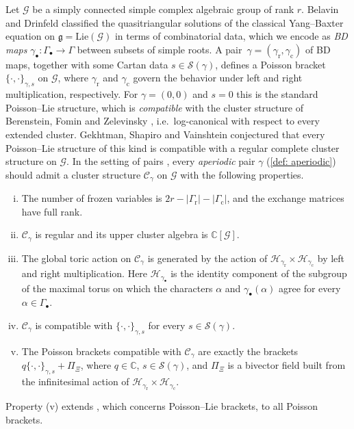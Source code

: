 \documentclass[a4paper]{amsart}
\numberwithin{equation}{section}
\theoremstyle{definition}
\theoremstyle{remark}
\newcommand{\bbC}{\mathbb{C}}
\newcommand{\mfg}{\mathfrak{g}}
\newcommand{\mcG}{\mathcal{G}}
\newcommand{\mcH}{\mathcal{H}}
\newcommand{\mcC}{\mathcal{C}}
\newcommand{\mcS}{\mathcal{S}}
\newcommand{\rr}{\mathrm{r}}
\newcommand{\cc}{\mathrm{c}}
\newcommand{\toric}{\Pi}
\begin{document}
Let $\mcG$ be a simply connected simple complex algebraic group of rank $r$.
Belavin and Drinfeld \cite{BD82} classified the quasitriangular solutions of the classical Yang--Baxter equation on $\mfg=\mathrm{Lie}(\mcG)$ in terms of combinatorial data, which we encode as \emph{BD maps} $\gamma_\bullet:\Gamma_\bullet\to\Gamma$ between subsets of simple roots.
A pair~$\gamma=(\gamma_{\rr},\gamma_{\cc})$ of BD maps, together with some Cartan data $s\in\mcS(\gamma)$, defines a Poisson bracket~$\{\cdot,\cdot\}_{\gamma,s}$ on $\mcG$, where $\gamma_{\rr}$ and $\gamma_{\cc}$ govern the behavior under left and right multiplication, respectively.
For $\gamma=(0,0)$ and $s=0$ this is the standard Poisson--Lie structure, which is \emph{compatible} with the cluster structure of Berenstein, Fomin and Zelevinsky \cite{BFZ05}, i.e.\ log-canonical with respect to every extended cluster.
Gekhtman, Shapiro and Vainshtein conjectured \cite[Conjecture~3.2]{GSV11} that every Poisson--Lie structure of this kind is compatible with a regular complete cluster structure on $\mcG$.
In the setting of pairs \cite{GSV19}, every \emph{aperiodic} pair $\gamma$ (\cref{def: aperiodic}) should admit a cluster structure $\mcC_\gamma$ on $\mcG$ with the following properties.
\begin{enumerate}[(i)]
  \item The number of frozen variables is $2r-|\Gamma_{\rr}|-|\Gamma_{\cc}|$, and the exchange matrices have full rank.
  \item $\mcC_\gamma$ is regular and its upper cluster algebra is $\bbC[\mcG]$.
  \item The global toric action on $\mcC_\gamma$ is generated by the action of $\mcH_{\gamma_{\rr}}\times\mcH_{\gamma_{\cc}}$ by left and right multiplication.
    Here $\mcH_{\gamma_\bullet}$ is the identity component of the subgroup of the maximal torus on which the characters $\alpha$ and $\gamma_\bullet(\alpha)$ agree for every $\alpha\in\Gamma_\bullet$.
  \item $\mcC_\gamma$ is compatible with $\{\cdot,\cdot\}_{\gamma,s}$ for every $s\in\mcS(\gamma)$.
  \item The Poisson brackets compatible with $\mcC_\gamma$ are exactly the brackets $q\{\cdot,\cdot\}_{\gamma,s}+\toric_\Xi$, where $q\in\bbC$, $s\in\mcS(\gamma)$, and $\toric_\Xi$ is a bivector field built from the infinitesimal action of $\mcH_{\gamma_{\rr}}\times\mcH_{\gamma_{\cc}}$.
\end{enumerate}
Property (v) extends \cite[Conjecture~3.2(v)]{GSV11}, which concerns Poisson--Lie brackets, to all Poisson brackets.
\end{document}
